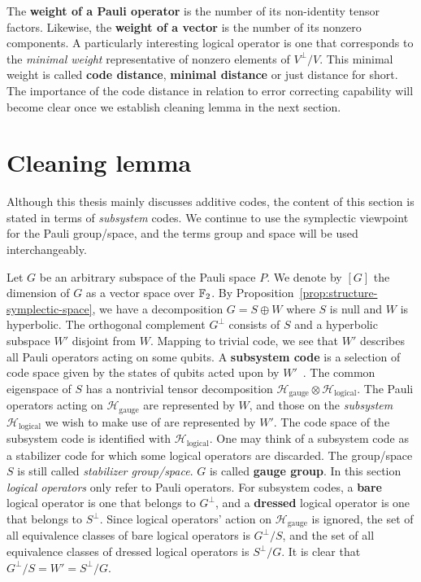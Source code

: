 The {\bf weight of a Pauli operator} is the number of its non-identity tensor factors.
Likewise, the {\bf weight of a vector} is the number of its nonzero components.
A particularly interesting logical operator is one that corresponds to
the \emph{minimal weight} representative of nonzero elements of $V^\perp / V$.
This minimal weight is called {\bf code distance}, {\bf minimal distance} or just distance for short.
The importance of the code distance in relation to error correcting capability
will become clear once we establish cleaning lemma in the next section.

\section{Cleaning lemma}
\label{sec:cleaning-lemma}

Although this thesis mainly discusses additive codes,
the content of this section is stated in terms of \emph{subsystem} codes.
We continue to use the symplectic viewpoint for the Pauli group/space,
and the terms group and space will be used interchangeably.

Let $G$ be an arbitrary subspace of the Pauli space $P$.
We denote by $[G]$ the dimension of $G$ as a vector space over $\mathbb{F}_2$.
By Proposition~\ref{prop:structure-symplectic-space}, we have a decomposition
$G = S \oplus W$ where $S$ is null and $W$ is hyperbolic.
The orthogonal complement $G^\perp$ consists of $S$ and a hyperbolic subspace $W'$ disjoint from $W$.
Mapping to trivial code, we see that $W'$ describes all Pauli operators acting on some qubits.
A {\bf subsystem code} is a selection of code space
given by the states of qubits acted upon by $W'$~\cite{Bacon2006Operator,Poulin2005Stabilizer}.
The common eigenspace of $S$
has a nontrivial tensor decomposition $\mathcal H _\text{gauge} \otimes \mathcal H _\text{logical}$.
The Pauli operators acting on $\mathcal H_\text{gauge}$ are represented by $W$,
and those on the \emph{subsystem} $\mathcal H _\text{logical}$ we wish to make use of are represented by $W'$.
The code space of the subsystem code is identified with $\mathcal H_\text{logical}$.
One may think of a subsystem code as a stabilizer code for which some logical operators are discarded.
The group/space $S$ is still called \emph{stabilizer group/space}.
$G$ is called {\bf gauge group}.
%
In this section \emph{logical operators} only refer to Pauli operators.
For subsystem codes, a {\bf bare} logical operator is one that belongs to $G^\perp$,
and a {\bf dressed} logical operator is one that belongs to $S^\perp$.
Since logical operators' action on $\mathcal H_\text{gauge}$ is ignored,
the set of all equivalence classes of bare logical operators is $G^\perp / S$,
and the set of all equivalence classes of dressed logical operators is $S^\perp / G$.
It is clear that $G^\perp / S = W' = S^\perp / G$.

